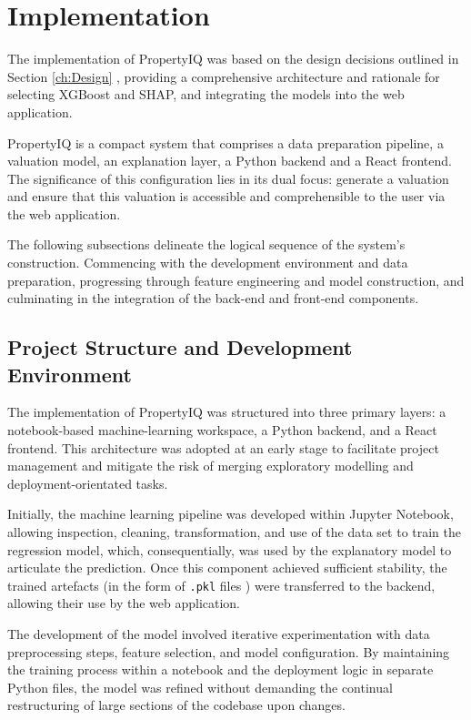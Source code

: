 \chapter{Implementation}
\label{ch:Implementation}

The implementation of PropertyIQ was based on the design decisions outlined in Section \ref{ch:Design} , providing a comprehensive architecture and rationale for selecting XGBoost and SHAP, and integrating the models into the web application.

PropertyIQ is a compact system that comprises a data preparation pipeline, a valuation model, an explanation layer, a Python backend and a React frontend. The significance of this configuration lies in its dual focus: generate a valuation and ensure that this valuation is accessible and comprehensible to the user via the web application. 

The following subsections delineate the logical sequence of the system's construction. Commencing with the development environment and data preparation, progressing through feature engineering and model construction, and culminating in the integration of the back-end and front-end components.

\section{Project Structure and Development Environment}

The implementation of PropertyIQ was structured into three primary layers: a notebook-based machine-learning workspace, a Python backend, and a React frontend. This architecture was adopted at an early stage to facilitate project management and mitigate the risk of merging exploratory modelling and deployment-orientated tasks. 

Initially, the machine learning pipeline was developed within Jupyter Notebook, allowing inspection, cleaning, transformation, and use of the data set to train the regression model, which, consequentially, was used by the explanatory model to articulate the prediction. Once this component achieved sufficient stability, the trained artefacts (in the form of \texttt{.pkl} files \parencite{Oderinwale2025}) were transferred to the backend, allowing their use by the web application.

The development of the model involved iterative experimentation with data preprocessing steps, feature selection, and model configuration. By maintaining the training process within a notebook and the deployment logic in separate Python files, the model was refined without demanding the continual restructuring of large sections of the codebase upon changes.

